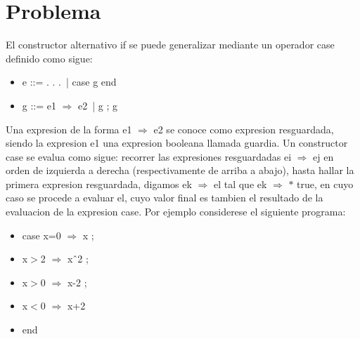 \documentclass{article}
\begin{document}
    \section{Problema}
    El constructor alternativo if se puede generalizar mediante un operador case definido como sigue:

        \begin{itemize}
            \item[ ] e ::= . . . \,| case g end
            \item[ ] g ::= e1 $\Rightarrow$ e2 \,| g ; g 
        \end{itemize}

    Una expresion de la forma e1 $\Rightarrow$ e2 se conoce como expresion resguardada, siendo la expresion e1 una expresion booleana llamada guardia. Un constructor case se evalua como sigue: recorrer las expresiones resguardadas ei $\Rightarrow$ ej en orden de izquierda a derecha (respectivamente de arriba a abajo), hasta hallar la primera expresion resguardada, digamos ek $\Rightarrow$ el tal que ek $\Rightarrow$ $*$ true, en cuyo caso se procede a evaluar el, cuyo valor final es tambien el resultado de la evaluacion de la expresion case. Por ejemplo considerese el siguiente programa:

        \begin{itemize}
            \item[ ] case x=0 $\Rightarrow$ x ;
            \item[ ] x$>$2 $\Rightarrow$ xˆ2 ;
            \item[ ] x$>$0 $\Rightarrow$ x-2 ;
            \item[ ] x$<$0 $\Rightarrow$ x+2
            \item[ ] end
        \end{itemize}
\end{document}
